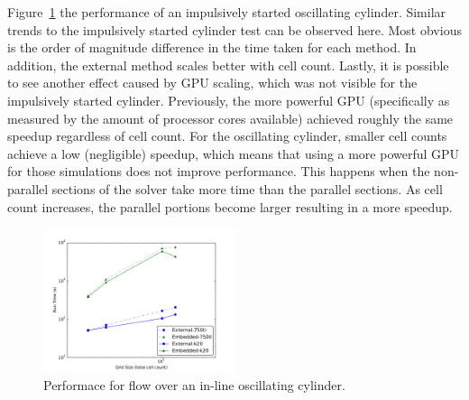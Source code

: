 \documentclass[preprint,12pt]{elsarticle}
\begin{document}
Figure~\ref{fig:oscperf} the performance of an impulsively started oscillating cylinder.
Similar trends to the impulsively started cylinder test can be observed here.
Most obvious is the order of magnitude difference in the time taken for each method.
In addition, the external method scales better with cell count.
Lastly, it is possible to see another effect caused by GPU scaling, which was not visible for the impulsively started cylinder.
Previously, the more powerful GPU (specifically as measured by the amount of processor cores available) achieved roughly the same speedup regardless of cell count.
For the oscillating cylinder, smaller cell counts achieve a low (negligible) speedup, which means that using a more powerful GPU for those simulations does not improve performance.
This happens when the non-parallel sections of the solver take more time than the parallel sections.
As cell count increases, the parallel portions become larger resulting in a more speedup.
\begin{figure}[!htb]
	\centering
	\includegraphics[width=0.5\textwidth]{osc_performance}
	\caption{Performace for flow over an in-line oscillating cylinder.}
	\label{fig:oscperf}
\end{figure}
\end{document}
